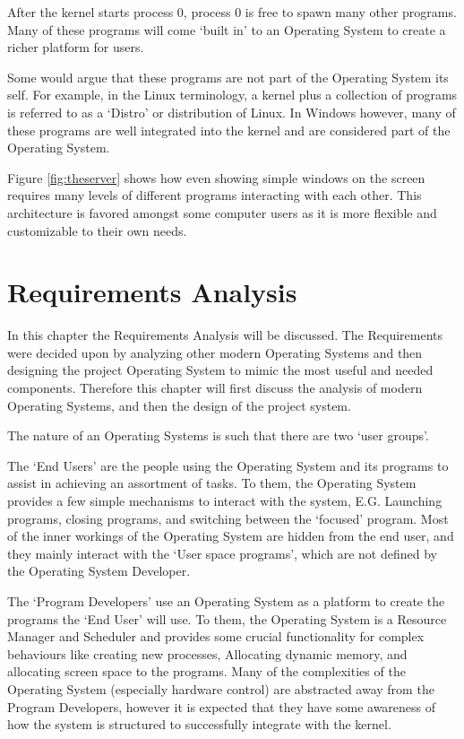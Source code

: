 \documentclass[a4paper]{report}
\begin{document}
After the kernel starts process 0, process 0 is free to spawn many other programs. Many of these programs will come `built in' to an Operating System to create a richer platform for users.

Some would argue that these programs are not part of the Operating System its self. For example, in the Linux terminology, a kernel plus a collection of programs is referred to as a `Distro' or distribution of Linux. In Windows however, many of these programs are well integrated into the kernel and are considered part of the Operating System.

Figure \ref{fig:theserver} shows how even showing simple windows on the screen requires many levels of different programs interacting with each other. This architecture is favored amongst some computer users as it is more flexible and customizable to their own needs.

\chapter{Requirements Analysis}

In this chapter the Requirements Analysis will be discussed. The Requirements were decided upon by analyzing other modern Operating Systems and then designing the project Operating System to mimic the most useful and needed components. Therefore this chapter will first discuss the analysis of modern Operating Systems, and then the design of the project system.


The nature of an Operating Systems is such that there are two `user groups'.


The `End Users' are the people using the Operating System and its programs to assist in achieving an assortment of tasks. To them, the Operating System provides a few simple mechanisms to interact with the system, E.G. Launching programs, closing programs, and switching between the `focused' program. Most of the inner workings of the Operating System are hidden from the end user, and they mainly interact with the `User space programs', which are not defined by the Operating System Developer.


The `Program Developers' use an Operating System as a platform to create the programs the `End User' will use. To them, the Operating System is a Resource Manager and Scheduler and provides some crucial functionality for complex behaviours like creating new processes, Allocating dynamic memory, and allocating screen space to the programs. Many of the complexities of the Operating System (especially hardware control) are abstracted away from the Program Developers, however it is expected that they have some awareness of how the system is structured to successfully integrate with the kernel.
\end{document}
